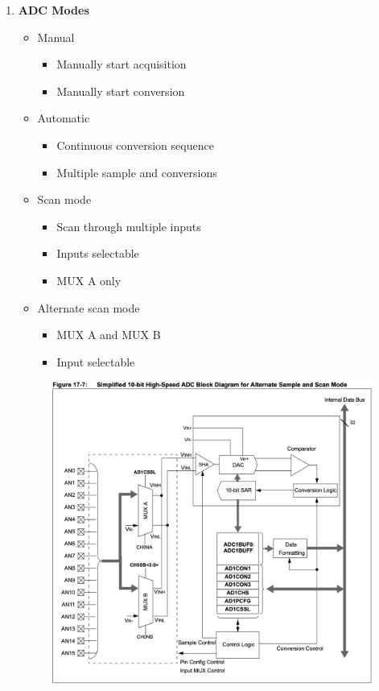 \documentclass[a4paper]{article}
\begin{document}
\begin{enumerate}[label = \arabic*.]
    \item \textbf{ADC Modes}
      \begin{itemize}[leftmargin = 1cm]
        \item Manual
          \begin{itemize}[leftmargin = 1cm]
            \item Manually start acquisition
            \item Manually start conversion
          \end{itemize}
        \item Automatic
          \begin{itemize}[leftmargin = 1cm]
            \item Continuous conversion sequence
            \item Multiple sample and conversions
          \end{itemize}
        \item Scan mode
          \begin{itemize}[leftmargin = 1cm]
            \item Scan through multiple inputs
            \item Inputs selectable
            \item MUX A only
          \end{itemize}
        \item Alternate scan mode
          \begin{itemize}[leftmargin = 1cm]
            \item MUX A and MUX B
            \item Input selectable
          \end{itemize}
      \end{itemize}

      \begin{figure}[H]
        \centering
        \includegraphics[width=0.6\linewidth]{ADC_channal_selection.png}
        \label{fig:ADC_channal_selection.png}
      \end{figure}


\end{enumerate}
\end{document}
